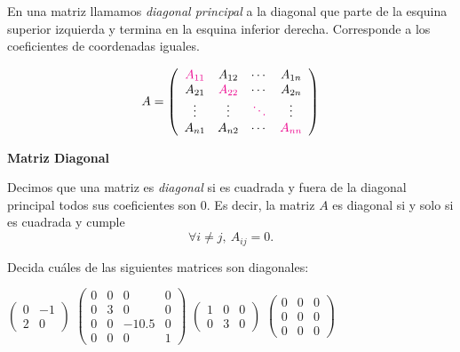 \documentclass[12pt]{book}
\def\pq{\vspace{0.5cm}}
\begin{document}
En una matriz llamamos \emph{diagonal principal} a la diagonal que parte de la esquina superior izquierda y termina en la esquina inferior derecha.
Corresponde a los coeficientes de coordenadas iguales.

\begin{minipage}{.45\textwidth}
\begin{center}
\end{center}
\end{minipage}
\begin{minipage}{.45\textwidth}
$$A = \left(\begin{array}{cccc}
\color{magenta}{A_{11}}& A_{12}& \cdots & A_{1n}\\
A_{21}& \color{magenta}{A_{22}}& \cdots & A_{2n}\\
\vdots& \vdots& \color{magenta}{\ddots} & \vdots\\
A_{n1}& A_{n2}& \cdots & \color{magenta}{A_{nn}}
\end{array}\right)$$
\end{minipage}

 \pq

{\bf Matriz Diagonal}

Decimos que una matriz es  \emph{diagonal} si es cuadrada y fuera de la diagonal principal todos sus coeficientes son 0.
Es decir, la matriz $A$ es diagonal si y solo si es cuadrada y cumple
  $$\forall i\not=j,\ A_{ij}=0.$$

Decida cuáles de las siguientes matrices son diagonales:

\begin{center}
$\left(\begin{array}{rr}0& -1\\ 2& 0\end{array}\right)$\qquad
$\left(\begin{array}{rrrr}0& 0&0&0\\ 0& 3& 0&0\\ 0&0&-10.5&0\\0&0&0&1\end{array}\right)$\qquad
$\left(\begin{array}{rrr}1& 0&0\\ 0& 3&0\end{array}\right)$\qquad
$\left(\begin{array}{rrr}0& 0&0\\ 0& 0&0\\0&0&0\end{array}\right)$
\end{center}
\end{document}
